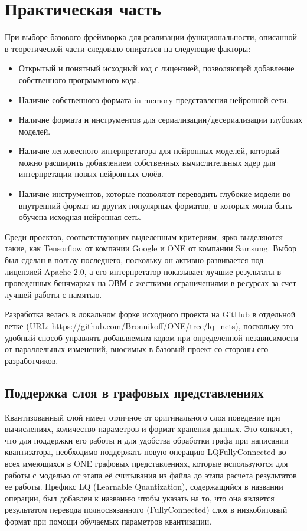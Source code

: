\chapter{Практическая часть}
\label{cha:ch_2}


При выборе базового фреймворка для реализации функциональности, описанной в теоретической части следовало опираться на следующие факторы:

\begin{itemize}
    \item Открытый и понятный исходный код с лицензией, позволяющей добавление собственного программного кода.
    \item Наличие собственного формата in-memory представления нейронной сети.
    \item Наличие формата и инструментов для сериализации/десериализации глубоких моделей.
    \item Наличие легковесного интерпретатора для нейронных моделей, который можно расширить добавлением собственных вычислительных ядер для интерпретации новых нейронных слоёв. 
    \item Наличие инструментов, которые позволяют переводить глубокие модели во внутренний формат из других популярных форматов, в которых могла быть обучена исходная нейронная сеть.
\end{itemize}

Среди проектов, соответствующих выделенным критериям, ярко выделяются такие, как Tensorflow от компании Google и ONE от компании Samsung. Выбор был сделан в пользу последнего, поскольку он активно развивается под лицензией Apache 2.0, а его интерпретатор показывает лучшие результаты в проведенных бенчмарках на ЭВМ с жесткими ограничениями в ресурсах за счет лучшей работы с памятью.

Разработка велась в локальном форке исходного проекта на GitHub в отдельной ветке (URL: https://github.com/Bronnikoff/ONE/tree/lq\_nets), поскольку это удобный способ управлять добавляемым кодом при определенной независимости от параллельных изменений, вносимых в базовый проект со стороны его разработчиков.

\section{Поддержка слоя в графовых представлениях}

Квантизованный слой имеет отличное от оригинального слоя поведение при вычислениях, количество параметров и формат хранения данных. Это означает, что для поддержки его работы и для удобства обработки графа при написании квантизатора, необходимо поддержать новую операцию LQFullyConnected во всех имеющихся в ONE графовых представлениях, которые используются для работы с моделью от этапа её считывания из файла до этапа расчета результатов ее работы. Префикс LQ (Learnable Quantization), содержащийся в названии операции, был добавлен к названию чтобы указать на то, что она является результатом перевода полносвязанного (FullyConnected) слоя в низкобитовый формат при помощи обучаемых параметров квантизации.


